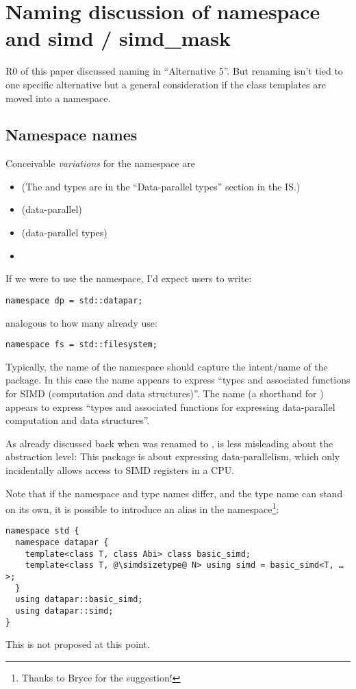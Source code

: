 \section{Naming discussion of namespace and simd / simd_mask}\label{sec:naming}
R0 of this paper discussed naming in “Alternative 5”.
But renaming isn't tied to one specific alternative but a general consideration
if the class templates are moved into a namespace.

\subsection{Namespace names}
Conceivable \emph{variations} for the \std{} namespace are
\begin{itemize}
  \item \std{} (The \simd and \mask types are in the “Data-parallel types” section in the IS.)
  \item \std{} (data-parallel)
  \item \std{} (data-parallel types)
  \item \std{}
\end{itemize}

If we were to use the  namespace, I'd expect users to write:\smallskip
\begin{lstlisting}
namespace dp = std::datapar;
\end{lstlisting}
analogous to how many already use:\smallskip
\begin{lstlisting}
namespace fs = std::filesystem;
\end{lstlisting}

Typically, the name of the namespace should capture the intent/name of the
package.
In this case the name  appears to express “types and associated
functions for SIMD (computation and data structures)”.
The name  (a shorthand for ) appears
to express “types and associated functions for expressing data-parallel
computation and data structures”.

As already discussed back when \stdx{} was renamed to
\stdx{},  is less misleading about the
abstraction level:
This package is about expressing data-parallelism, which only incidentally
allows access to SIMD registers in a CPU.

Note that if the namespace and type names differ, and the type name can stand
on its own, it is possible to introduce an alias in the  namespace\footnote{
  Thanks to Bryce for the suggestion!
}:
\smallskip\begin{lstlisting}
namespace std {
  namespace datapar {
    template<class T, class Abi> class basic_simd;
    template<class T, @\simdsizetype@ N> using simd = basic_simd<T, … >;
  }
  using datapar::basic_simd;
  using datapar::simd;
}
\end{lstlisting}
This is not proposed at this point.

